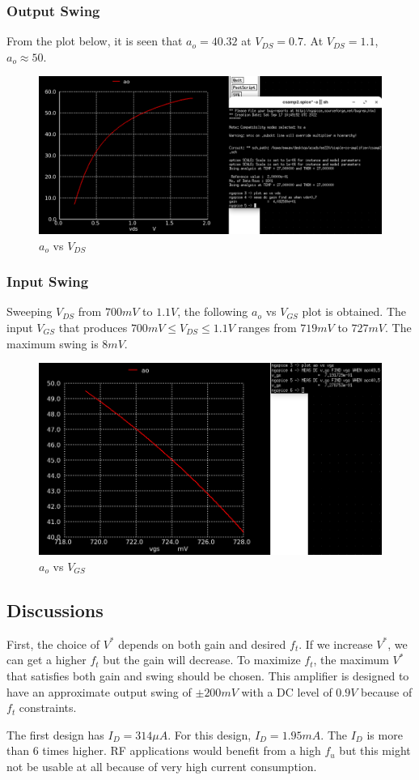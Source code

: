 \documentclass[conference]{IEEEtran}
\begin{document}
\subsubsection{Output Swing}
From the plot below, it is seen that $a_o=40.32$ at $V_{DS}=0.7$. At $V_{DS}=1.1$, $a_o\approx 50$.
\begin{figure}[H]
	\centering 
	\includegraphics[width=\columnwidth]{gain-fumax-vds.png}
	\caption{$a_o$ vs $V_{DS}$}
	\label{ao-fumax-vds}	
\end{figure}
\subsubsection{Input Swing}
Sweeping $V_{DS}$ from $700mV$ to $1.1V$, the following $a_o$ vs $V_{GS}$ plot is obtained. 
The input $V_{GS}$ that produces $700mV \leq V_{DS} \leq 1.1V$ ranges from $719mV$ to $727mV$. 
The maximum swing is $8mV$. 
\begin{figure}[H]
	\centering 
	\includegraphics[width=\columnwidth]{gain-fumax-vgs.png}
	\caption{$a_o$ vs $V_{GS}$}
	\label{ao-fumax-vgs}	
\end{figure}
\subsection{Discussions}
First, the choice of $V^*$ depends on both gain and desired $f_t$. If we increase $V^*$, we 
can get a higher $f_t$ but the gain will decrease. To maximize $f_t$, the maximum $V^*$ that 
satisfies both gain and swing should be chosen. This amplifier is designed to have an approximate output swing of $\pm 200mV$ with a DC level of $0.9V$ because of $f_t$ constraints. 

\vspace{8pt}
The first design has $I_D = 314\mu A$. For this design, $I_D=1.95mA$. The $I_D$ is more than 6 times higher. RF applications would benefit from a high $f_u$ but this might not be usable at all because of very high current consumption. 
\end{document}
